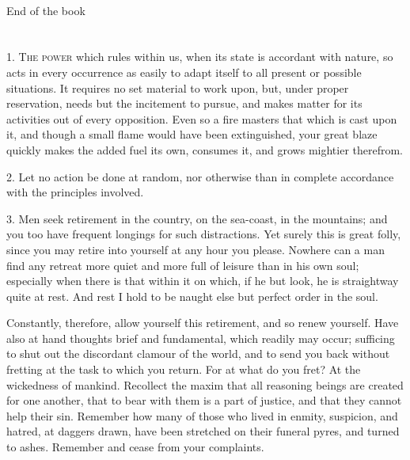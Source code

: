 \documentclass{book}
\newcommand\terminus[1]{\vspace{2em}\emph{#1} \\[2em] \begin{center}End of the \ordinalstring{chapter} book\end{center}}
\begin{document}
\terminus{}

\chapter[The power...]{}

1. \textsc{The power} which rules within us, when its state is accordant
with nature, so acts in every occurrence as easily to adapt itself to
all present or possible situations. It requires no set material to work
upon, but, under proper reservation, needs but the incitement to pursue,
and makes matter for its activities out of every opposition. Even so a
fire masters that which is cast upon it, and though a small flame would
have been extinguished, your great blaze quickly makes the added fuel
its own, consumes it, and grows mightier therefrom.

2. Let no action be done at random, nor otherwise than in complete
accordance with the principles involved.

3. Men seek retirement in the country, on the sea-coast, in the
mountains; and you too have frequent longings for such distractions.
Yet surely this is great folly, since you may retire into yourself at
any hour you please. Nowhere can a man find any retreat more quiet and
more full of leisure than in his own soul; especially when there is
that within it on which, if he but look, he is straightway quite at
rest. And rest I hold to be naught else but perfect order in the
soul.

Constantly, therefore, allow yourself this retirement, and so renew
yourself. Have also at hand thoughts brief and fundamental, which
readily may occur; sufficing to shut out the discordant clamour of the
world, and to send you back without fretting at the task to which you
return. For at what do you fret? At the wickedness of mankind. Recollect
the maxim that all reasoning beings are created for one another, that
to bear with them is a part of justice, and that they cannot help their
sin. Remember how many of those who lived in enmity, suspicion, and
hatred, at daggers drawn, have been stretched on their funeral pyres,
and turned to ashes. Remember and cease from your complaints.
\end{document}
